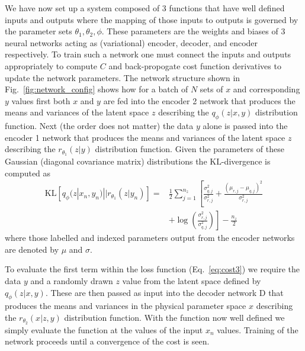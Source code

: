 \documentclass[%
showpacs,
 amsmath,amssymb,
 aps,
 twocolumn,
 prl,
 reprint,
floatfix,
]{revtex4-1}
\begin{document}
We have now set up a system composed of 3 functions that have well defined
inputs and outputs where the mapping of those inputs to outputs is governed by
the parameter sets $\theta_{1},\theta_{2},\phi$. These parameters are the
weights and biases of 3 neural networks acting as (variational) encoder,
decoder, and encoder respectively. To train such a network one must connect the
inputs and outputs appropriately to compute $C$ and back-propogate cost
function derivatives to update the network parameters. The network structure
shown in Fig.~\ref{fig:network_config} shows how for a batch of $N$ sets of $x$
and corresponding $y$ values first both $x$ and $y$ are fed into the encoder 2
network that produces the means and variances of the latent space $z$
describing the $q_{\phi}(z|x,y)$ distribution function. Next (the order does
not matter) the data $y$ alone is passed into the encoder 1 network that
produces the means and variances of the latent space $z$ describing the
$r_{\theta_{1}}(z|y)$ distribution function. Given the parameters of these
Gaussian (diagonal covariance matrix) distributions the $\text{KL}$-divergence
is computed as
%
\begin{align}\label{eq:klgauss}
\text{KL}\left[q_{\phi}(z|x_{n},y_{n})||r_{\theta_{1}}(z|y_{n})\right] =&
\frac{1}{2}\sum_{j=1}^{n_{z}}\left[\frac{\sigma_{q,j}^{2}}{\sigma_{r,j}^{2}} +
\frac{(\mu_{r,j}-\mu_{q,j})^{2}}{\sigma_{r,j}^{2}}\right.\nonumber\\ 
&\left.+
\log\left(\frac{\sigma_{r,j}^{2}}{\sigma_{q,j}^{2}}\right)\right] -
\frac{n_{z}}{2}
\end{align}
%
where those labelled and indexed parameters output from the encoder networks
are denoted by $\mu$ and $\sigma$.

To evaluate the first term within the loss function (Eq.~\ref{eq:cost3}) we
require the data $y$ and a randomly drawn $z$ value from the latent space defined
by $q_{\phi}(z|x,y)$. These are then passed as input into the decoder network D
that produces the means and variances in the physical parameter space $x$ describing
the $r_{\theta_{2}}(x|z,y)$ distribution function. With the function now well
defined we simply evaluate the function at the values of the input $x_{n}$
values. Training of the network proceeds until a convergence of the cost is
seen. 
\end{document}
